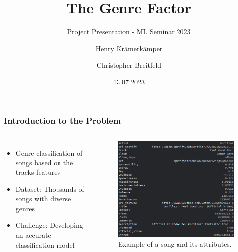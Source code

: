 \documentclass[8pt]{beamer}
\title{The Genre Factor}
\subtitle{Project Presentation - ML Seminar 2023}
\author{Henry Krämerkämper\\%
  \and%
  Christopher Breitfeld}
\institute{Technische Universität Dortmund}
\date{13.07.2023}
\begin{document}
\begin{frame}
  \titlepage
\end{frame}

\begin{frame}
\frametitle{Introduction to the Problem}
  \begin{columns}
    \begin{itemize}
      \item Genre classification of songs based on the tracks features
      \item Dataset: Thousands of songs with diverse genres
      \item Challenge: Developing an accurate classification model
    \end{itemize}
    \begin{figure}
      \centering
      \includegraphics[scale=0.3]{figures/Beispielsong.png}
      \caption{Example of a song and its attributes.}
    \end{figure}
  \end{columns}
\end{frame}
\end{document}
